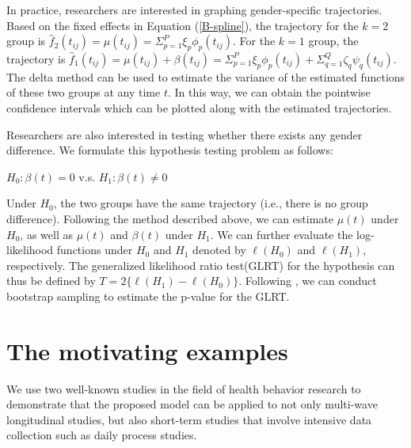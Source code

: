In practice, researchers are interested in graphing
gender-specific trajectories. Based on the fixed effects in
Equation (\ref{B-spline}), the trajectory for the $k=2$ group is
$\hat{f}_{2}(t_{ij})=\mu(t_{ij})=\Sigma_{p=1}^{P}\xi_{p}\phi_{p}(t_{ij})$.
For the $k=1$ group, the trajectory is
$\hat{f}_{1}(t_{ij})=\mu(t_{ij})+\beta(t_{ij})=\Sigma_{p=1}^{P}\xi_{p}\phi_{p}(t_{ij})+\Sigma_{q=1}^{Q}\zeta_{q}\psi_{q}(t_{ij})$.
The delta method can be used to estimate the variance of the
estimated functions of these two groups at any time $t$. In this
way, we can obtain the pointwise confidence intervals which can be
plotted along with the estimated trajectories.

Researchers are also interested in testing whether there exists
any gender difference. We formulate this hypothesis testing
problem as follows:
\begin{center}
$H_{0}: \beta(t)=0$ v.s. $H_{1}: \beta(t)\neq0$
\end{center}
Under $H_{0}$, the two groups have the same trajectory (i.e.,
there is no group difference). Following the method described
above, we can estimate $\mu(t)$ under $H_{0}$, as well as $\mu(t)$
and $\beta(t)$ under $H_{1}$. We can further evaluate the
log-likelihood functions under $H_{0}$ and $H_{1}$ denoted by
$\ell(H_{0})$ and $\ell(H_{1})$, respectively. The generalized
likelihood ratio test(GLRT) for the hypothesis can thus be defined
by $T=2\{\ell(H_{1})-\ell(H_{0})\}$. Following \cite{cai00}, we
can conduct bootstrap sampling to estimate the p-value for the
GLRT.


\section{The motivating examples}

We use two well-known studies in the field of health behavior
research to demonstrate that the proposed model can be applied to
not only multi-wave longitudinal studies, but also short-term
studies that involve intensive data collection such as daily
process studies.



